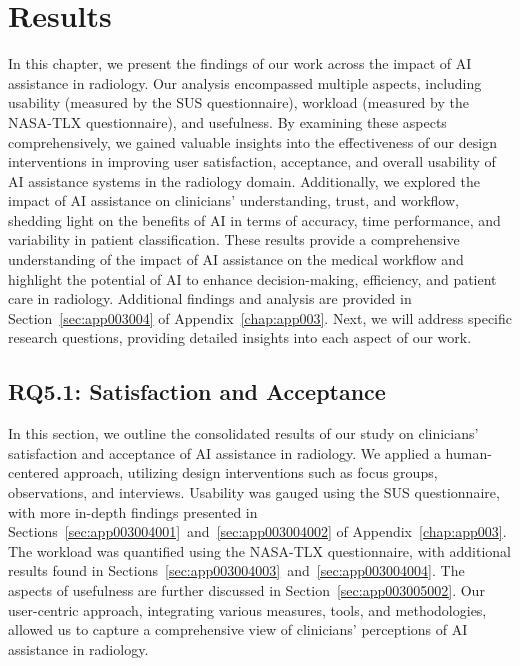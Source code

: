 \section{Results}
\label{sec:chap005006}

In this chapter, we present the findings of our work across the impact of \ac{AI} assistance in radiology.
Our analysis encompassed multiple aspects, including usability (measured by the \ac{SUS} questionnaire), workload (measured by the \ac{NASA-TLX} questionnaire), and usefulness.
By examining these aspects comprehensively, we gained valuable insights into the effectiveness of our design interventions in improving user satisfaction, acceptance, and overall usability of \ac{AI} assistance systems in the radiology domain.
Additionally, we explored the impact of \ac{AI} assistance on clinicians' understanding, trust, and workflow, shedding light on the benefits of \ac{AI} in terms of accuracy, time performance, and variability in patient classification.
These results provide a comprehensive understanding of the impact of \ac{AI} assistance on the medical workflow and highlight the potential of \ac{AI} to enhance decision-making, efficiency, and patient care in radiology.
Additional findings and analysis are provided in Section~\ref{sec:app003004} of Appendix~\ref{chap:app003}.
Next, we will address specific research questions, providing detailed insights into each aspect of our work.

\subsection{RQ5.1: Satisfaction and Acceptance}
\label{sec:chap005006001}

In this section, we outline the consolidated results of our study on clinicians' satisfaction and acceptance of \ac{AI} assistance in radiology.
We applied a human-centered approach, utilizing design interventions such as focus groups, observations, and interviews.
Usability was gauged using the \ac{SUS} questionnaire, with more in-depth findings presented in Sections~\ref{sec:app003004001}~and~\ref{sec:app003004002} of Appendix~\ref{chap:app003}.
The workload was quantified using the \ac{NASA-TLX} questionnaire, with additional results found in Sections~\ref{sec:app003004003}~and~\ref{sec:app003004004}.
The aspects of usefulness are further discussed in Section~\ref{sec:app003005002}.
Our user-centric approach, integrating various measures, tools, and methodologies, allowed us to capture a comprehensive view of clinicians' perceptions of \ac{AI} assistance in radiology.

